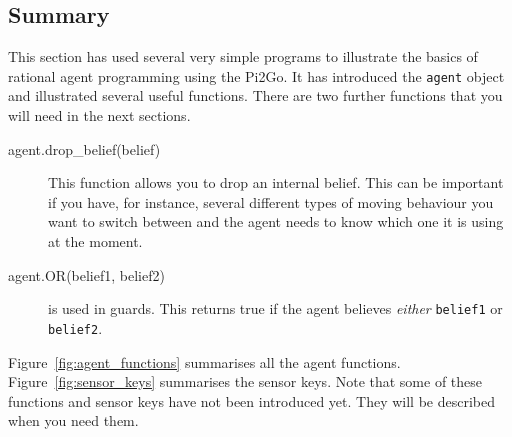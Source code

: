 \documentclass[a4,12pt]{article}
\begin{document}
\subsection{Summary}
This section has used several very simple programs to illustrate the basics of rational agent programming using the Pi2Go.  It has introduced the \lstinline{agent} object and illustrated several useful functions.  There are two further functions that you will need in the next sections.

\begin{description}
\item[agent.drop\_belief(belief)] This function allows you to drop an internal belief.  This can be important if you have, for instance, several different types of moving behaviour you want to switch between and the agent needs to know which one it is using at the moment.
  \item[agent.OR(belief1, belief2)] is used in guards.  This returns true if the agent believes \emph{either} \lstinline{belief1} or \lstinline{belief2}.
\end{description}

Figure~\ref{fig:agent_functions} summarises all the agent functions.  Figure~\ref{fig:sensor_keys} summarises the sensor keys.  Note that some of these functions and sensor keys have not been introduced yet.  They will be described when you need them.
\end{document}
